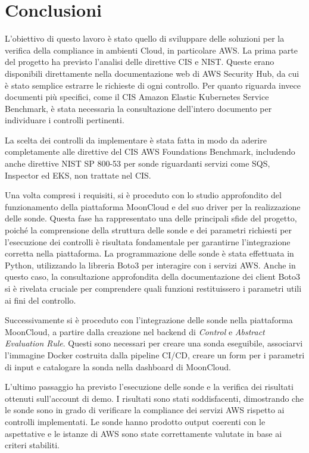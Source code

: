 \chapter{Conclusioni}
\label{cap:conclusioni}

L'obiettivo di questo lavoro è stato quello di sviluppare delle soluzioni per la verifica della compliance in ambienti Cloud, in particolare AWS. La prima parte del progetto ha previsto l'analisi delle direttive CIS e NIST. Queste erano disponibili direttamente nella documentazione web di AWS Security Hub, da cui è stato semplice estrarre le richieste di ogni controllo. Per quanto riguarda invece documenti più specifici, come il CIS Amazon Elastic Kubernetes Service Benchmark, è stata necessaria la consultazione dell'intero documento per individuare i controlli pertinenti.

La scelta dei controlli da implementare è stata fatta in modo da aderire completamente alle direttive del CIS AWS Foundations Benchmark, includendo anche direttive NIST SP 800-53 per sonde riguardanti servizi come SQS, Inspector ed EKS, non trattate nel CIS.

Una volta compresi i requisiti, si è proceduto con lo studio approfondito del funzionamento della piattaforma MoonCloud e del suo driver per la realizzazione delle sonde. Questa fase ha rappresentato una delle principali sfide del progetto, poiché la comprensione della struttura delle sonde e dei parametri richiesti per l'esecuzione dei controlli è risultata fondamentale per garantirne l'integrazione corretta nella piattaforma. La programmazione delle sonde è stata effettuata in Python, utilizzando la libreria Boto3 per interagire con i servizi AWS. Anche in questo caso, la consultazione approfondita della documentazione dei client Boto3 si è rivelata cruciale per comprendere quali funzioni restituissero i parametri utili ai fini del controllo.

Successivamente si è proceduto con l'integrazione delle sonde nella piattaforma MoonCloud, a partire dalla creazione nel backend di \emph{Control} e \emph{Abstract Evaluation Rule}. Questi sono necessari per creare una sonda eseguibile, associarvi l'immagine Docker costruita dalla pipeline CI/CD, creare un form per i parametri di input e catalogare la sonda nella dashboard di MoonCloud. 

L'ultimo passaggio ha previsto l'esecuzione delle sonde e la verifica dei risultati ottenuti sull'account di demo. I risultati sono stati soddisfacenti, dimostrando che le sonde sono in grado di verificare la compliance dei servizi AWS rispetto ai controlli implementati. Le sonde hanno prodotto output coerenti con le aspettative e le istanze di AWS sono state correttamente valutate in base ai criteri stabiliti.

